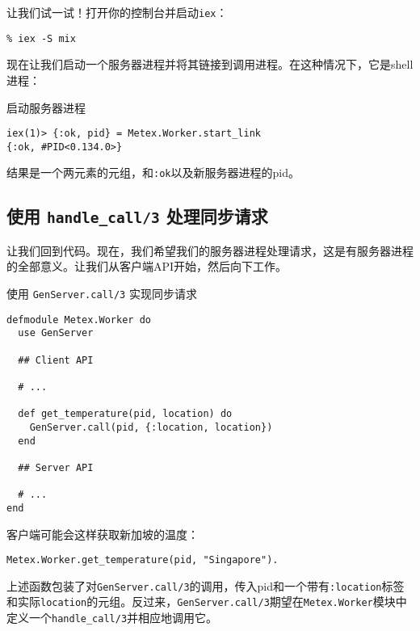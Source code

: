 让我们试一试！打开你的控制台并启动\texttt{iex}：

\texttt{\% iex -S mix}

现在让我们启动一个服务器进程并将其链接到调用进程。在这种情况下，它是shell进程：

\begin{code}{启动服务器进程}
\begin{verbatim}
iex(1)> {:ok, pid} = Metex.Worker.start_link
{:ok, #PID<0.134.0>}
\end{verbatim}
\label{lst:start_server_process}
\end{code}

结果是一个两元素的元组，和\texttt{:ok}以及新服务器进程的pid。


\subsection{使用 \texttt{handle\_call/3} 处理同步请求}

让我们回到代码。现在，我们希望我们的服务器进程处理请求，这是有服务器进程的全部意义。让我们从客户端API开始，然后向下工作。

\begin{code}{使用 \texttt{GenServer.call/3} 实现同步请求}
\begin{verbatim}
defmodule Metex.Worker do
  use GenServer

  ## Client API

  # ...

  def get_temperature(pid, location) do
    GenServer.call(pid, {:location, location})
  end

  ## Server API

  # ...
end
\end{verbatim}
\label{lst:use_genserver_call}
\end{code}

客户端可能会这样获取新加坡的温度：

\begin{code}{}
\begin{verbatim}
Metex.Worker.get_temperature(pid, "Singapore").
\end{verbatim}
\end{code}

上述函数包装了对\texttt{GenServer.call/3}的调用，传入pid和一个带有\texttt{:location}标签和实际\texttt{location}的元组。反过来，\texttt{GenServer.call/3}期望在\texttt{Metex.Worker}模块中定义一个\texttt{handle\_call/3}并相应地调用它。

